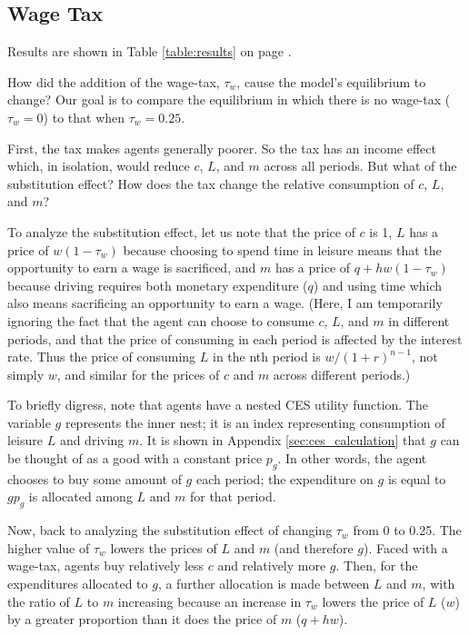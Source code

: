 \documentclass[letter, 12pt, epsf,leqno]{article}
\begin{document}

\subsection{Wage Tax}

Results are shown in Table \ref{table:results} on page \pageref{table:results}.

How did the addition of the wage-tax, $\tau_w$, cause the model's equilibrium to change?  Our goal is to compare the equilibrium in which there is no wage-tax ($\tau_w=0$) to that when $\tau_w = 0.25$.

First, the tax makes agents generally poorer.  So the tax has an income effect which, in isolation, would reduce $c$, $L$, and $m$ across all periods.  But what of the substitution effect?  How does the tax change the relative consumption of $c$, $L$, and $m$? 

To analyze the substitution effect, let us note that the price of $c$ is 1, $L$ has a price of $w(1-\tau_w)$ because choosing to spend time in leisure means that the opportunity to earn a wage is sacrificed, and $m$ has a price of $q+hw(1-\tau_w)$ because driving requires both monetary expenditure ($q$) and using time which also means sacrificing an opportunity to earn a wage.  (Here, I am temporarily ignoring the fact that the agent can choose to consume $c$, $L$, and $m$ in different periods, and that the price of consuming in each period is affected by the interest rate.  Thus the price of consuming $L$ in the nth period is $w/(1+r)^{n-1}$, not simply $w$, and similar for the prices of $c$ and $m$ across different periods.)

To briefly digress, note that agents have a nested CES utility function.  The variable $g$ represents the inner nest; it is an index representing consumption of leisure $L$ and driving $m$.  It is shown in Appendix \ref{sec:ces_calculation} that $g$ can be thought of as a good with a constant price $p_g$.  In other words, the agent chooses to buy some amount of $g$ each period; the expenditure on $g$ is equal to $gp_g$ is allocated among $L$ and $m$ for that period.

Now, back to analyzing the substitution effect of changing $\tau_w$ from 0 to 0.25.  The higher value of $\tau_w$ lowers the prices of $L$ and $m$ (and therefore $g$).  Faced with a wage-tax, agents buy relatively less $c$ and relatively more $g$.  Then, for the expenditures allocated to $g$, a further allocation is made between $L$ and $m$, with the ratio of $L$ to $m$ increasing because an increase in $\tau_w$ lowers the price of $L$ ($w$) by a greater proportion than it does the price of $m$ ($q+hw$).  
\end{document}
